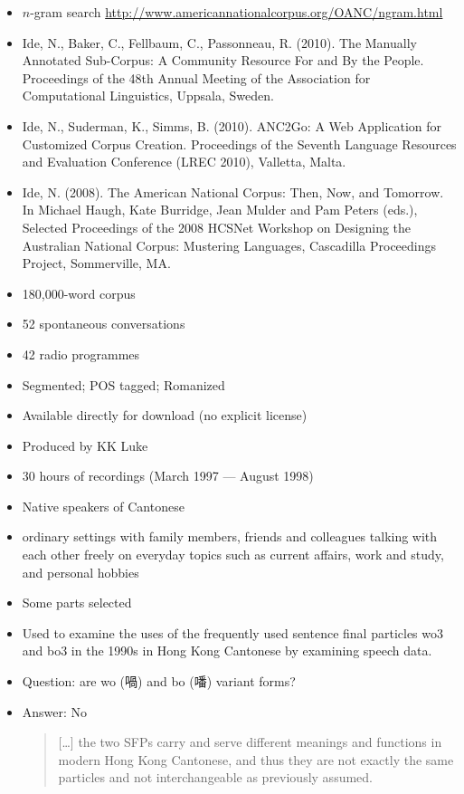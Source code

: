 \documentclass[a4paper,landscape,headrule,footrule,dvips]{foils}
\begin{document}
\begin{CJK}{UTF8}{min}
\begin{itemize} \small
\item $n$-gram search \url{http://www.americannationalcorpus.org/OANC/ngram.html}
\item  Ide, N., Baker, C., Fellbaum, C., Passonneau, R. (2010). The Manually Annotated Sub-Corpus: A Community Resource For and By the People. Proceedings of the 48th Annual Meeting of the Association for Computational Linguistics, Uppsala, Sweden.
\item  Ide, N., Suderman, K., Simms, B. (2010). ANC2Go: A Web Application for Customized Corpus Creation. Proceedings of the Seventh Language Resources and Evaluation Conference (LREC 2010), Valletta, Malta.
\item  Ide, N. (2008). The American National Corpus: Then, Now, and Tomorrow. In Michael Haugh, Kate Burridge, Jean Mulder and Pam Peters (eds.), Selected Proceedings of the 2008 HCSNet Workshop on Designing the Australian National Corpus: Mustering Languages, Cascadilla Proceedings Project, Sommerville, MA. 
\end{itemize}


\begin{itemize}
\item 180,000-word corpus
\item 52 spontaneous conversations
\item 42 radio programmes
\item Segmented; POS tagged; Romanized
\item Available directly for download (no explicit license)
\item Produced by KK Luke
\end{itemize}
\begin{itemize}
\item 30 hours of recordings (March 1997 --- August 1998)
\item Native speakers of Cantonese
\item ordinary settings with family members, friends and colleagues talking with each other freely on everyday topics such as current affairs, work and study, and personal hobbies
\item Some parts selected
\end{itemize}
\begin{itemize}
\item Used to examine the uses of the frequently used sentence final particles wo3 and bo3 in the 1990s in Hong Kong Cantonese by examining speech data.
\item Question: are wo (喎) and bo (噃) variant forms?
\item Answer: No
  \begin{quotation}
    {[\ldots]} the two SFPs carry and serve different meanings and functions in modern Hong Kong Cantonese, and thus they are not exactly the same particles and not interchangeable as previously assumed.
    \citep[p21]{Leung:2010}
  \end{quotation}


\end{itemize}
\end{CJK}
\end{document}
